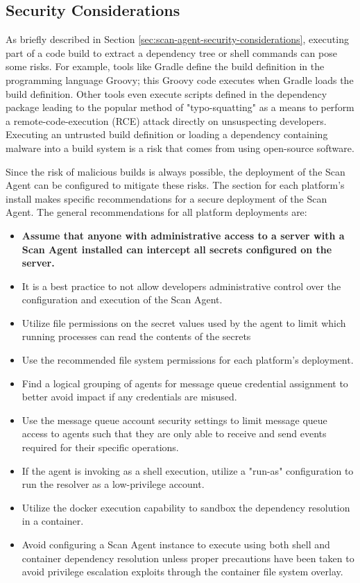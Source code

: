 \subsection{Security Considerations}\label{sec:scan-agent-security}

As briefly described in Section \ref{sec:scan-agent-security-considerations}, executing
part of a code build to extract a dependency tree or shell commands can pose some risks. For example,
tools like Gradle define the build definition in the programming language Groovy; this Groovy
code executes when Gradle loads the build definition.  Other tools even execute scripts defined
in the dependency package leading to the popular method of "typo-squatting" as a means to
perform a remote-code-execution (RCE) attack directly on unsuspecting developers.  Executing an
untrusted build definition or loading a dependency containing malware into a build system is
a risk that comes from using open-source software.

Since the risk of malicious builds is always possible, the deployment of the Scan Agent
can be configured to mitigate these risks.  The section for each platform's install makes specific
recommendations for a secure deployment of the Scan Agent.  The general recommendations
for all platform deployments are:

\begin{itemize}
  \item \textbf{Assume that anyone with administrative access to a server with a Scan Agent installed
    can intercept all secrets configured on the \cxoneflow server.}
  \item It is a best practice to not allow developers administrative control over the configuration and
    execution of the Scan Agent.
  \item Utilize file permissions on the secret values used by the agent to limit which running processes
    can read the contents of the secrets
  \item Use the recommended file system permissions for each platform's deployment.
  \item Find a logical grouping of agents for message queue credential assignment to better avoid
    impact if any credentials are misused.
  \item Use the message queue account security settings to limit message queue access to agents such that they are only
    able to receive and send events required for their specific operations.
  \item If the agent is invoking \scaresolver as a shell execution, utilize a "run-as" configuration to
    run the resolver as a low-privilege account.
  \item Utilize the \scaresolver docker execution capability to sandbox the dependency resolution in a container.
  \item Avoid configuring a Scan Agent instance to execute \scaresolver using both shell and container dependency resolution
    unless proper precautions have been taken to avoid privilege escalation exploits through the container file system overlay.
\end{itemize}


